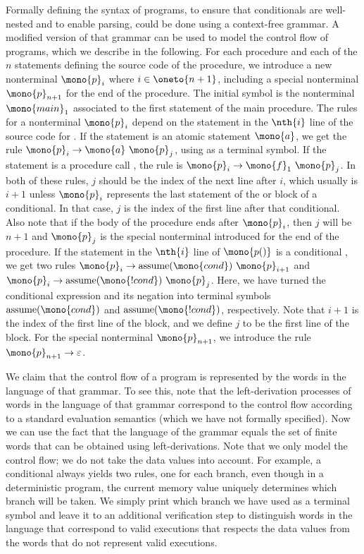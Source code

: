 \documentclass[../../diss.tex]{subfiles}
\begin{document}
Formally defining the syntax of programs, \eg to ensure that conditionals are well-nested and to enable parsing, could be done using a context-free grammar.
A modified version of that grammar can be used to model the control flow of programs, which we describe in the following.
For each procedure  and each of the $n$ statements defining the source code of the procedure, we introduce a new nonterminal $\mono{p}_i$ where $i \in \oneto{n+1}$, including a special nonterminal $\mono{p}_{n+1}$ for the end of the procedure.
The initial symbol is the nonterminal $\mono{main}_1$ associated to the first statement of the main procedure.
The rules for a nonterminal $\mono{p}_{i}$ depend on the statement in the $\nth{i}$ line of the source code for .
If the statement is an atomic statement $\mono{a}$, we get the rule $\mono{p}_i \to \mono{a} \ \mono{p}_j$, using  as a terminal symbol.
If the statement is a procedure call , the rule is $\mono{p}_i \to \mono{f}_1 \ \mono{p}_j$.
In both of these rules, $j$ should be the index of the next line after $i$, which usually is $i+1$ unless $\mono{p}_i$ represents the last statement of the  or  block of a conditional.
In that case, $j$ is the index of the first line after that conditional.
Also note that if the body of the procedure ends after $\mono{p}_i$, then $j$ will be $n+1$ and $\mono{p}_j$ is the special nonterminal introduced for the end of the procedure.
If the statement in the $\nth{i}$ line of $\mono{p()}$ is a conditional , we get two rules $\mono{p}_i \to \text{assume}(\mono{cond}) \ \mono{p}_{i+1}$ and $\mono{p}_i \to \text{assume}(\mono{!cond}) \ \mono{p}_j$.
Here, we have turned the conditional expression and its negation into terminal symbols $\text{assume}(\mono{cond})$ and $\text{assume}(\mono{!cond})$, respectively.
Note that $i+1$ is the index of the first line of the  block, and we define $j$ to be the first line of the  block.
For the special nonterminal $\mono{p}_{n+1}$, we introduce the rule $\mono{p}_{n+1} \to \eps$.

We claim that the control flow of a program is represented by the words in the language of that grammar.
To see this, note that the left-derivation processes of words in the language of that grammar correspond to the control flow according to a standard evaluation semantics (which we have not formally specified).
Now we can use the fact that the language of the grammar equals the set of finite words that can be obtained using left-derivations.
Note that we only model the control flow; we do not take the data values into account.
For example, a conditional always yields two rules, one for each branch, even though in a deterministic program, the current memory value uniquely determines which branch will be taken.
We simply print which branch we have used as a terminal symbol and leave it to an additional verification step to distinguish words in the language that correspond to valid executions that respects the data values from the words that do not represent valid executions.
\end{document}
